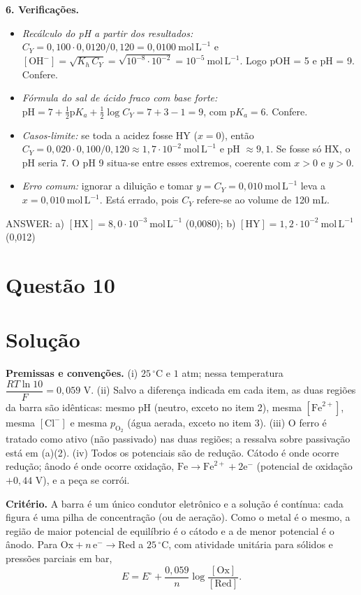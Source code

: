 \documentclass{article}%
\begin{document}
\textbf{6. Verificações.}
\begin{itemize}
\item \emph{Recálculo do pH a partir dos resultados:} $C_Y = 0{,}100\cdot0{,}0120/0{,}120 = 0{,}0100\ \mathrm{mol\,L^{-1}}$ e $[\mathrm{OH^-}] = \sqrt{K_h\,C_Y} = \sqrt{10^{-8}\cdot10^{-2}} = 10^{-5}\ \mathrm{mol\,L^{-1}}$. Logo pOH = 5 e pH = 9. Confere.
\item \emph{Fórmula do sal de ácido fraco com base forte:} $\mathrm{pH} = 7 + \tfrac{1}{2}\mathrm{p}K_a + \tfrac{1}{2}\log C_Y = 7 + 3 - 1 = 9$, com $\mathrm{p}K_a = 6$. Confere.
\item \emph{Casos-limite:} se toda a acidez fosse HY ($x=0$), então $C_Y = 0{,}020\cdot0{,}100/0{,}120 \approx 1{,}7\cdot10^{-2}\ \mathrm{mol\,L^{-1}}$ e pH $\approx 9{,}1$. Se fosse só HX, o pH seria 7. O pH 9 situa-se entre esses extremos, coerente com $x>0$ e $y>0$.
\item \emph{Erro comum:} ignorar a diluição e tomar $y = C_Y = 0{,}010\ \mathrm{mol\,L^{-1}}$ leva a $x = 0{,}010\ \mathrm{mol\,L^{-1}}$. Está errado, pois $C_Y$ refere-se ao volume de 120 mL.
\end{itemize}

ANSWER: a) $[\mathrm{HX}] = 8{,}0\cdot10^{-3}\ \mathrm{mol\,L^{-1}}$ (0,0080); b) $[\mathrm{HY}] = 1{,}2\cdot10^{-2}\ \mathrm{mol\,L^{-1}}$ (0,012)%
\newpage%
\section*{Questão 10}

\section*{Solução}

\textbf{Premissas e convenções.} (i) $25\,^\circ\mathrm{C}$ e $1$ atm; nessa temperatura $\dfrac{RT\ln 10}{F} = 0{,}059$ V. (ii) Salvo a diferença indicada em cada item, as duas regiões da barra são idênticas: mesmo $\mathrm{pH}$ (neutro, exceto no item 2), mesma $[\mathrm{Fe}^{2+}]$, mesma $[\mathrm{Cl}^-]$ e mesma $p_{\mathrm{O}_2}$ (água aerada, exceto no item 3). (iii) O ferro é tratado como ativo (não passivado) nas duas regiões; a ressalva sobre passivação está em (a)(2). (iv) Todos os potenciais são de redução. Cátodo é onde ocorre redução; ânodo é onde ocorre oxidação, $\mathrm{Fe} \rightarrow \mathrm{Fe}^{2+} + 2\mathrm{e}^-$ (potencial de oxidação $+0{,}44$ V), e a peça se corrói.

\textbf{Critério.} A barra é um único condutor eletrônico e a solução é contínua: cada figura é uma pilha de concentração (ou de aeração). Como o metal é o mesmo, a região de maior potencial de equilíbrio é o cátodo e a de menor potencial é o ânodo. Para $\mathrm{Ox} + n\,\mathrm{e}^- \rightarrow \mathrm{Red}$ a $25\,^\circ\mathrm{C}$, com atividade unitária para sólidos e pressões parciais em bar,
\[
E = E^\circ + \frac{0{,}059}{n}\log\frac{[\mathrm{Ox}]}{[\mathrm{Red}]}.
\]
\end{document}
